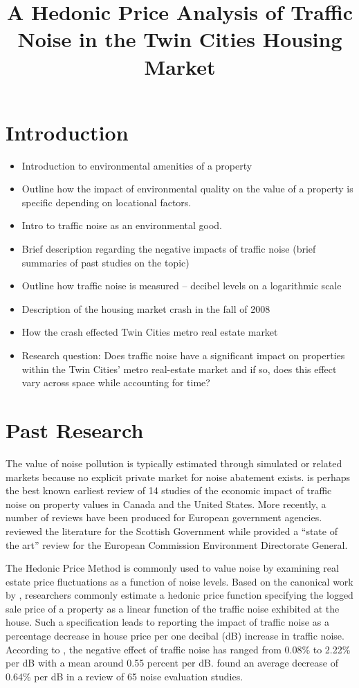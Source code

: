 \documentclass{article}\usepackage{graphicx, color}
\title{A Hedonic Price Analysis of Traffic Noise in the Twin Cities Housing Market}
\date{}
\begin{document}
\maketitle

\section{Introduction}

\begin{itemize}
\item Introduction to environmental amenities of a property
\item Outline how the impact of environmental quality on the value of a property is specific depending on locational factors.
\item Intro to traffic noise as an environmental good.
\item Brief description regarding the negative impacts of traffic noise (brief summaries of past studies on the topic)
\item Outline how traffic noise is measured – decibel levels on a logarithmic scale
\item Description of the housing market crash in the fall of 2008
\item How the crash effected Twin Cities metro real estate market
\item Research question: Does traffic noise have a significant impact on properties within the Twin Cities’ metro real-estate market and if so, does this effect vary across space while accounting for time?
\end{itemize}

\section{Past Research}\label{sec:lit}
The value of noise pollution is typically estimated through simulated or related markets because no explicit private market for noise abatement exists. \citet{Nelson1982} is perhaps the best known earliest review of 14 studies of the economic impact of traffic noise on property values in Canada and the United States. More recently, a number of reviews have been produced for European government agencies. \citet{Bateman2001} reviewed the literature for the Scottish Government while \citet{Navrud2002} provided a ``state of the art'' review for the European Commission Environment Directorate General.

The Hedonic Price Method is commonly used to value noise by examining real estate price fluctuations as a function of noise levels. Based on the canonical work by \citet{Rosen1974}, researchers commonly estimate a hedonic price function specifying the logged sale price of a property as a linear function of the traffic noise exhibited at the house. Such a specification leads to reporting the impact of traffic noise as a percentage decrease in house price per one decibal (dB) increase in traffic noise. According to \citet{Batemen2001}, the negative effect of traffic noise has ranged from 0.08\% to 2.22\% per dB with a mean around 0.55 percent per dB. \citet{Navrud2002} found an average decrease of 0.64\% per dB in a review of 65 noise evaluation studies. 
\end{document}
